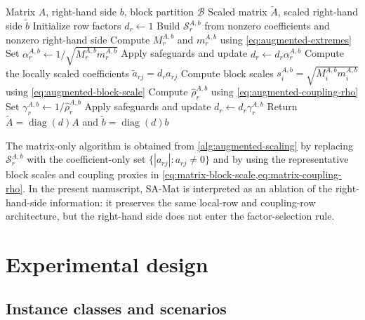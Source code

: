 \documentclass[AMA,Times1COL]{WileyNJDv5} %
\newcommand{\diag}{\operatorname{diag}}
\newcommand{\abs}[1]{\left\lvert #1 \right\rvert}
\newcommand{\methodMat}{SA-Mat}
\providecommand{\DIFaddbegin}{} %
\providecommand{\DIFaddend}{} %
\providecommand{\DIFdelend}{} %
\begin{document}
\DIFdelend \DIFaddbegin \begin{algorithm}[t]
\caption{Augmented structure-aware row scaling}
\label{alg:augmented-scaling}
\begin{algorithmic}[1]
\Require Matrix $A$, right-hand side $b$, block partition $\mathcal{B}$
\Ensure Scaled matrix $\widetilde A$, scaled right-hand side $\widetilde b$
\State Initialize row factors $d_r\gets 1$
    \State Build $\mathcal{S}_r^{A,b}$ from nonzero coefficients and nonzero right-hand side
      \State Compute $M_r^{A,b}$ and $m_r^{A,b}$ using \cref{eq:augmented-extremes}
      \State Set $\alpha_r^{A,b}\gets 1/\sqrt{M_r^{A,b}m_r^{A,b}}$
      \State Apply safeguards and update $d_r\gets d_r\alpha_r^{A,b}$
    \EndIf
  \EndFor
\EndFor
\State Compute the locally scaled coefficients $\widetilde a_{rj}=d_r a_{rj}$
\State Compute block scales $s_i^{A,b}=\sqrt{M_i^{A,b}m_i^{A,b}}$ using \cref{eq:augmented-block-scale}
  \State Compute $\widehat\rho_r^{A,b}$ using \cref{eq:augmented-coupling-rho}
    \State Set $\gamma_r^{A,b}\gets 1/\widehat\rho_r^{A,b}$
    \State Apply safeguards and update $d_r\gets d_r\gamma_r^{A,b}$
  \EndIf
\EndFor
\State Return $\widetilde A=\diag(d)A$ and $\widetilde b=\diag(d)b$
\end{algorithmic}
\end{algorithm}
\DIFaddend 

The matrix-only algorithm is obtained from \cref{alg:augmented-scaling} by replacing
$\mathcal{S}_r^{A,b}$ with the coefficient-only set
$\{\abs{a_{rj}}:a_{rj}\neq 0\}$ and by using the representative block scales and coupling
proxies in \cref{eq:matrix-block-scale,eq:matrix-coupling-rho}. In the present
manuscript, \methodMat{} is interpreted as an ablation of the right-hand-side
information: it preserves the same local-row and coupling-row architecture, but the
right-hand side does not enter the factor-selection rule.

\section{Experimental design}
\label{sec:experimental-design}

\subsection{Instance classes and scenarios}
\end{document}
